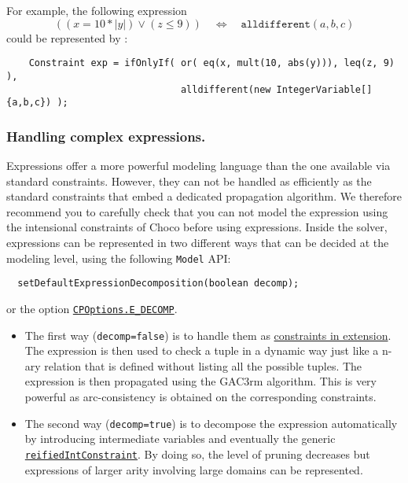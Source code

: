 For example, the following expression
$$((x = 10 * |y|) \lor (z \le 9))\quad \iff\quad \texttt{alldifferent}(a,b,c)$$
could be represented by :
\begin{lstlisting}
	Constraint exp = ifOnlyIf( or( eq(x, mult(10, abs(y))), leq(z, 9) ), 
                               alldifferent(new IntegerVariable[]{a,b,c}) );
\end{lstlisting}


\subsubsection{Handling complex expressions.}\label{model:handlingcomplexexpressions}\hypertarget{model:handlingcomplexexpressions}{}
Expressions offer a more powerful modeling language than the one available via standard constraints. However, they 
can not be handled as efficiently as the standard constraints that embed a dedicated propagation algorithm. We therefore
recommend you to carefully check that you can not model the expression using the intensional constraints of Choco before using
expressions.
Inside the solver, expressions can be represented in two different ways that can be decided at the modeling level, using the following {\tt Model} API:
\begin{lstlisting}
  setDefaultExpressionDecomposition(boolean decomp);
\end{lstlisting}
or the option \hyperlink{edecomp:edecompoptions}{\tt CPOptions.E\_DECOMP}.
\begin{itemize}
\item The first way (\texttt{decomp=false}) is to handle them as \hyperlink{model:arbitraryconstraintsinextension}{constraints in extension}. The expression is then used to check a tuple in a dynamic way just like a n-ary relation that is defined without listing all the possible tuples. The expression is then propagated using the GAC3rm algorithm. This is very powerful as arc-consistency is obtained on the corresponding constraints.
\item The second way (\texttt{decomp=true}) is to decompose the expression automatically by introducing intermediate variables and eventually the generic \hyperlink{reifiedintconstraint:reifiedintconstraintconstraint}{\tt reifiedIntConstraint}. By doing so, the level of pruning decreases but expressions of larger arity involving large domains can be represented.
\end{itemize}

